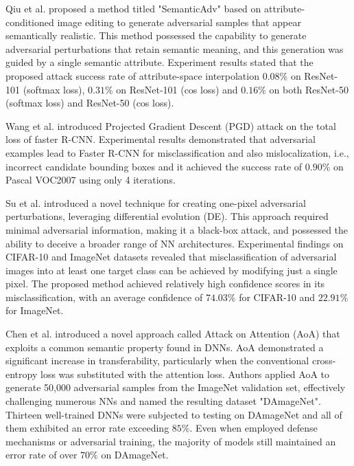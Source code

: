 \documentclass[sn-mathphys]{sn-jnl}%
\theoremstyle{thmstyleone}%
\theoremstyle{thmstyletwo}%
\theoremstyle{thmstylethree}%
\begin{document}
 Qiu et al. \cite{qiu2020semanticadv} proposed a method titled "SemanticAdv" based on attribute-conditioned image editing to generate adversarial samples that appear semantically realistic. This method possessed the capability to generate adversarial perturbations that retain semantic meaning, and this generation was guided by a single semantic attribute. Experiment results stated that the proposed attack success rate of attribute-space interpolation $0.08\%$ on ResNet-101 (softmax loss), $0.31\%$ on ResNet-101 (cos loss) and $0.16\%$ on both ResNet-50 (softmax loss) and ResNet-50 (cos loss).

 Wang et al. \cite{Wang2020} introduced Projected Gradient Descent (PGD) attack on the total loss of faster R-CNN. Experimental results demonstrated that adversarial examples lead to Faster R-CNN for misclassification and also mislocalization, i.e., incorrect candidate bounding boxes and it achieved the success rate of $0.90\%$ on Pascal VOC2007 \cite{voc2007} using only 4 iterations.

 Su et al. \cite{Su} introduced a novel technique for creating one-pixel adversarial perturbations, leveraging differential evolution (DE). This approach required minimal adversarial information, making it a black-box attack, and possessed the ability to deceive a broader range of NN architectures. Experimental findings on CIFAR-10 and ImageNet datasets revealed that misclassification of adversarial images into at least one target class can be achieved by modifying just a single pixel. The proposed method achieved relatively high confidence scores in its misclassification, with an average confidence of $74.03\%$ for CIFAR-10 and $22.91\%$ for ImageNet. %

 Chen et al. \cite{Chen2020} introduced a novel approach called Attack on Attention (AoA) that exploits a common semantic property found in DNNs. AoA demonstrated a significant increase in transferability, particularly when the conventional cross-entropy loss was substituted with the attention loss. Authors applied AoA to generate 50,000 adversarial samples from the ImageNet validation set, effectively challenging numerous NNs and named the resulting dataset "DAmageNet". Thirteen well-trained DNNs were subjected to testing on DAmageNet and all of them exhibited an error rate exceeding $85\%$. Even when employed defense mechanisms or adversarial training, the majority of models still maintained an error rate of over $70\%$ on DAmageNet.
\end{document}
